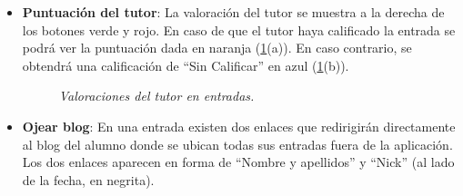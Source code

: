 \documentclass[a4paper, 12pt]{book}
\begin{document}
\begin{itemize}
  Si ese comentario es eliminado, el usuario obtendr\'a una penalizaci\'on de tres \textit{planets}.
  
  \item {\bfseries Puntuaci\'on del tutor}: La valoraci\'on del tutor se muestra a la derecha de los botones verde y rojo. En caso de que el tutor haya
  calificado la entrada se podr\'a ver la puntuaci\'on dada en naranja (\ref{figura:hiloalumno7}(a)). En caso contrario, se obtendr\'a una calificaci\'on de 
  ``Sin Calificar'' en azul (\ref{figura:hiloalumno7}(b)).
  \begin{figure}
    \centering
    \caption{\textit{Valoraciones del tutor en entradas.}}
    \label{figura:hiloalumno7}
  \end{figure}
  
  \item {\bfseries Ojear blog}: En una entrada existen dos enlaces que redirigir\'an directamente al blog del alumno donde se ubican todas sus entradas 
  fuera de la aplicaci\'on. Los dos enlaces aparecen en forma de ``Nombre y apellidos'' y ``Nick'' (al lado de la fecha, en negrita).
  

\end{itemize}
\end{document}
